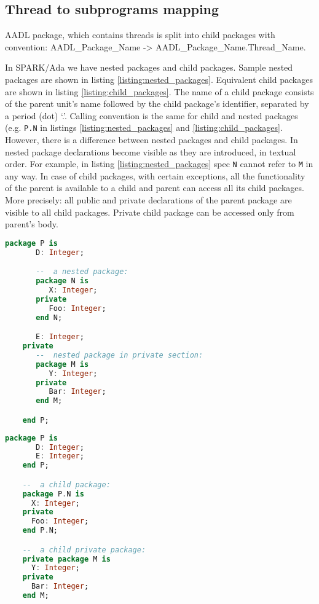 \subsection{Thread to subprograms mapping}
\label{codegen:mapping:threads}

AADL package, which contains threads is split into child packages with convention: AADL\_Package\_Name -> AADL\_Package\_Name.Thread\_Name.

In SPARK/Ada we have nested packages and child packages. Sample nested packages are shown in listing \ref{listing:nested_packages}. Equivalent child packages are shown in listing \ref{listing:child_packages}. The name of a child package consists of the parent unit's name followed by the child package's identifier, separated by a period (dot) `.'. Calling convention is the same for child and nested packages (e.g. \lstinline{P.N} in listings \ref{listing:nested_packages} and \ref{listing:child_packages}. However, there is a difference between nested packages and child packages. In nested package declarations become visible as they are introduced, in textual order. For example, in listing \ref{listing:nested_packages} spec \lstinline{N} cannot refer to \lstinline{M} in any way. In case of child packages, with certain exceptions, all the functionality of the parent is available to a child and parent can access all its child packages. More precisely: all public and private declarations of the parent package are visible to all child packages. Private child package can be accessed only from parent's body.

\begin{lstlisting}[language=ada, frame=single, gobble=0, caption={Nested packages in SPARK/Ada}, label={listing:nested_packages}]
	package P is
	   D: Integer;

	   --  a nested package:
	   package N is
	      X: Integer;
	   private
	      Foo: Integer;
	   end N;

	   E: Integer;
	private
	   --  nested package in private section:
	   package M is
	      Y: Integer;
	   private
	      Bar: Integer;
	   end M;

	end P;
\end{lstlisting}

\begin{lstlisting}[language=ada, frame=single, gobble=0, caption={Child packages in SPARK/Ada}, label={listing:child_packages}]
	package P is
	   D: Integer;
	   E: Integer;
	end P;

	--  a child package:
	package P.N is
      X: Integer;
   	private
      Foo: Integer;
	end P.N;

	--  a child private package:
	private package M is
	  Y: Integer;
	private
	  Bar: Integer;
	end M;
\end{lstlisting}

